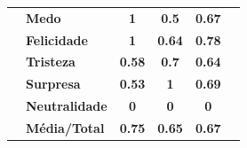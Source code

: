 \begin{table}[]
\begin{tabular}{llcccc}
                                       & \textbf{Medo}         & \textbf{1}                            & \textbf{0.5}                           & \textbf{0.67}                         &                                       \\
                                       & \textbf{Felicidade}   & \textbf{1}                            & \textbf{0.64}                          & \textbf{0.78}                         &                                       \\
                                       & \textbf{Tristeza}     & \textbf{0.58}                         & \textbf{0.7}                           & \textbf{0.64}                         &                                       \\
                                       & \textbf{Surpresa}     & \textbf{0.53}                         & \textbf{1}                             & \textbf{0.69}                         &                                       \\
                                       & \textbf{Neutralidade} & \textbf{0}                            & \textbf{0}                             & \textbf{0}                            &                                       \\
                                       & \textbf{Média/Total}  & \textbf{0.75}                         & \textbf{0.65}                          & \textbf{0.67}                         &                                       \\ \hline
\end{tabular}
\end{table}



